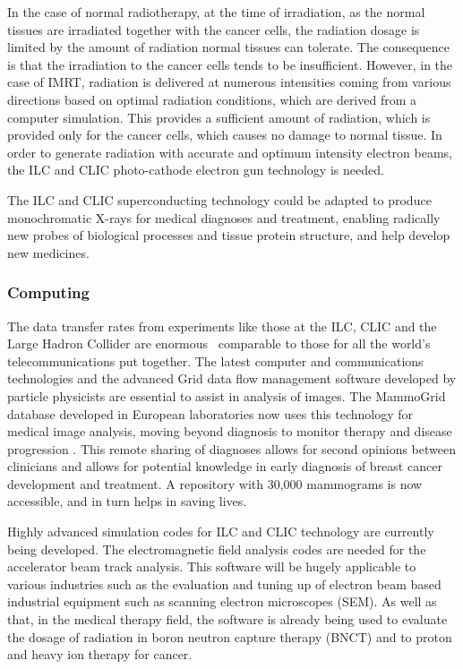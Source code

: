 In the case of normal radiotherapy, at the time of irradiation, as the normal tissues are irradiated together with the cancer cells, the radiation dosage is limited by the amount of radiation normal tissues can tolerate. The consequence is that the irradiation to the cancer cells tends to be insufficient. However, in the case of IMRT, radiation is delivered at numerous intensities coming from various directions based on optimal radiation conditions, which are derived from a computer simulation. This provides a sufficient amount of radiation, which is provided only for the cancer cells, which causes no damage to normal tissue. In order to generate radiation with accurate and optimum intensity electron beams, the ILC and CLIC photo-cathode electron gun technology is needed.
 
The ILC and CLIC superconducting technology could be adapted to produce monochromatic X-rays for medical diagnoses and treatment, enabling radically new probes of biological processes and tissue protein structure, and help develop new medicines.
 
\subsubsection{Computing}

The data transfer rates from experiments like those at the ILC, CLIC and the Large Hadron Collider are enormous  \textemdash \, comparable to those for all the world's telecommunications put together. The latest computer and communications technologies and the advanced Grid data flow management software developed by particle physicists are essential to assist in analysis of images. The MammoGrid database developed in European laboratories now uses this technology for medical image analysis, moving beyond diagnosis to monitor therapy and disease progression \cite{CERN:MammoGrid}. This remote sharing of diagnoses allows for second opinions between clinicians and allows for potential knowledge in early diagnosis of breast cancer development and treatment. A repository with 30,000 mammograms is now accessible, and in turn helps in saving lives. \cite{ILC:WhyNeed}
 
Highly advanced simulation codes for ILC and CLIC technology are currently being developed. The electromagnetic field analysis codes are needed for the accelerator beam track analysis. This software will be hugely applicable to various industries such as the evaluation and tuning up of electron beam based industrial equipment such as scanning electron microscopes (SEM). As well as that, in the medical therapy field, the software is already being used to evaluate the dosage of radiation in boron neutron capture therapy (BNCT) and to proton and heavy ion therapy for cancer.

